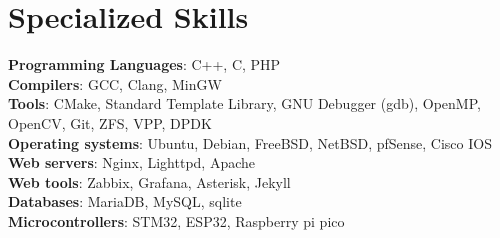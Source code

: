\documentclass[letterpaper,11pt]{article}
\makeatletter
\newcommand{\resumeSubheading}[4]{
    \vspace{-2pt}\item
    \begin{tabular*}{0.97\textwidth}[t]{l@{\extracolsep{\fill}}r}
        \textbf{#1} & #2 \\
        \textit{\small #3} & \textit{\small #4} \\
    \end{tabular*}\vspace{-10pt}
}
\newcommand{\resumeSubHeadingListStart}{\begin{itemize}[leftmargin=0.15in, label={}]}
\newcommand{\resumeSubHeadingListEnd}{\end{itemize}}
\makeatother
\begin{document}

\section{Specialized Skills}
\begin{itemize}[leftmargin=0.15in, label={}]
    \normalsize{\item{
                    \textbf{Programming Languages}{: C++, C, PHP} \\
                    \textbf{Compilers}{: GCC, Clang, MinGW}\\
                    \textbf{Tools}{: CMake, Standard Template Library, GNU Debugger (gdb), OpenMP, OpenCV, Git, ZFS, VPP, DPDK} \\
                    \textbf{Operating systems}{: Ubuntu, Debian, FreeBSD, NetBSD, pfSense, Cisco IOS} \\
                    \textbf{Web servers}{: Nginx, Lighttpd, Apache} \\
                    \textbf{Web tools}{: Zabbix, Grafana, Asterisk, Jekyll} \\
                    \textbf{Databases}{: MariaDB, MySQL, sqlite} \\
                    \textbf{Microcontrollers}{: STM32, ESP32, Raspberry pi pico} \\
              }}
\end{itemize}

\end{document}
